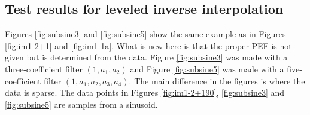 \subsection{Test results for leveled inverse interpolation }
Figures \ref{fig:subsine3} and \ref{fig:subsine5}
show the same example as in Figures
\ref{fig:im1-2+1} and
\ref{fig:im1-1a}.
What is new here is that the proper PEF
is not given but is determined from the data.
Figure \ref{fig:subsine3} was made with a three-coefficient filter $(1,a_1,a_2)$ and
Figure \ref{fig:subsine5} was made with a five-coefficient filter
$(1,a_1,a_2,a_3,a_4)$.
The main difference in the figures is where the data is sparse.
The data points in Figures
\ref{fig:im1-2+190},
\ref{fig:subsine3} and
\ref{fig:subsine5} are samples from a sinusoid.
\par
{}
%
%

